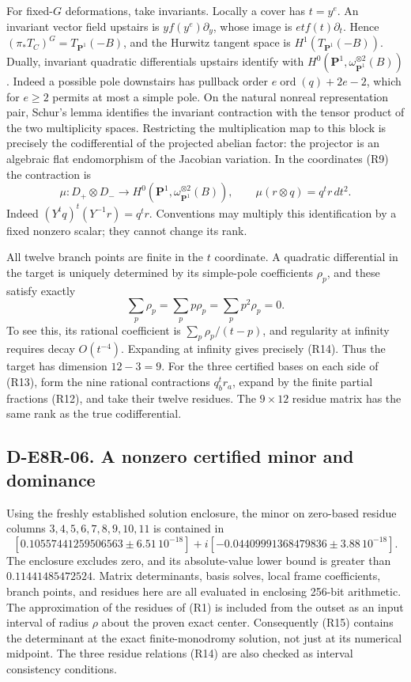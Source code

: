 For fixed-$G$ deformations, take invariants. Locally a cover has
$t=y^e$. An invariant vector field upstairs is
$y f(y^e)\partial_y$, whose image is
$e t f(t)\partial_t$. Hence
$(\pi_*T_C)^G=T_{\mathbf P^1}(-B)$, and the Hurwitz tangent space
is $H^1(T_{\mathbf P^1}(-B))$. Dually, invariant quadratic
differentials upstairs identify with
$H^0(\mathbf P^1,\omega_{\mathbf P^1}^{\otimes2}(B))$.
Indeed a possible pole downstairs has pullback order
$e\operatorname{ord}(q)+2e-2$, which for $e\ge2$ permits at most
a simple pole. On the natural nonreal representation pair, Schur's
lemma identifies the invariant contraction with the tensor product
of the two multiplicity spaces. Restricting the multiplication map
to this block is precisely the codifferential of the projected
abelian factor: the projector is an algebraic flat endomorphism of
the Jacobian variation. In the coordinates (R9) the contraction is
\[
\mu:D_+\otimes D_-\longrightarrow
 H^0(\mathbf P^1,\omega_{\mathbf P^1}^{\otimes2}(B)),\qquad
\mu(r\otimes q)=q^tr\,dt^2.
\tag{R13}
\]
Indeed $(Y^tq)^t(Y^{-1}r)=q^tr$. Conventions may multiply this
identification by a fixed nonzero scalar; they cannot change its rank.

All twelve branch points are finite in the $t$ coordinate. A
quadratic differential in the target is uniquely determined by its
simple-pole coefficients $\rho_p$, and these satisfy exactly
\[
\sum_p\rho_p=\sum_pp\rho_p=\sum_pp^2\rho_p=0.
\tag{R14}
\]
To see this, its rational coefficient is
$\sum_p\rho_p/(t-p)$, and regularity at infinity requires decay
$O(t^{-4})$. Expanding at infinity gives precisely (R14).
Thus the target has dimension $12-3=9$. For the three certified
bases on each side of (R13), form the nine rational contractions
$q_b^tr_a$, expand by the finite partial fractions (R12), and take
their twelve residues. The $9\times12$ residue matrix has the same
rank as the true codifferential.

\subsection*{D-E8R-06. A nonzero certified minor and dominance}
Using the freshly established solution enclosure, the minor on
zero-based residue columns $3,4,5,6,7,8,9,10,11$ is contained in
\[
[0.10557441259506563\ \mathord\pm\ 6.51\,10^{-18}]
+i[-0.04409991368479836\ \mathord\pm\ 3.88\,10^{-18}].
\tag{R15}
\]
The enclosure excludes zero, and its absolute-value lower bound is
greater than $0.11441485472524$. Matrix determinants, basis solves,
local frame coefficients, branch points, and residues here are all
evaluated in enclosing 256-bit arithmetic. The approximation of the
residues of (R1) is included from the outset as an input interval of
radius $\rho$ about the proven exact center. Consequently (R15)
contains the determinant at the exact finite-monodromy solution,
not just at its numerical midpoint. The three residue relations
(R14) are also checked as interval consistency conditions.


